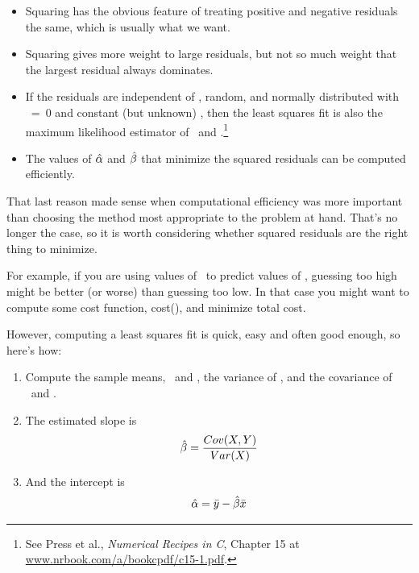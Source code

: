 \documentclass[12pt]{book}
\begin{document}
\begin{itemize}

\item Squaring has the obvious feature of treating positive and
negative residuals the same, which is usually what we want.

\item Squaring gives more weight to large residuals, but not
so much weight that the largest residual always dominates.

\item If the residuals are independent of \x, random, and normally
  distributed with \mymu~=~0 and constant (but unknown) \mysigma, then
  the least squares fit is also the maximum likelihood estimator of
  \myinter~and \myslope.\footnote{See Press et al., {\em Numerical Recipes in C},
    Chapter 15 at \url{www.nrbook.com/a/bookcpdf/c15-1.pdf}.}

\item The values of $\hat{\alpha}$ and $\hat{\beta}$ that minimize
  the squared residuals can be computed efficiently.

\end{itemize}

That last reason made sense when computational efficiency was more
important than choosing the method most appropriate to the problem
at hand.  That's no longer the case, so it is worth considering
whether squared residuals are the right thing to minimize.

For example, if you are using values of \X~to predict values of \Y,
guessing too high might be better (or worse) than guessing too low.
In that case you might want to compute some cost function,
cost(\myeps{}), and minimize total cost.

However, computing a least squares fit is quick, easy and often good
enough, so here's how:

\begin{enumerate}

\item Compute the sample means, \myxbar~and \myybar, the variance
of \X, and the covariance of \X~and \Y.

\item The estimated slope is
%
\[ \hat{\beta} = \frac{Cov(X,Y)}{Var(X)} \]
%
\item And the intercept is
%
\[ \hat{\alpha} = \bar{y} - \hat{\beta} \bar{x} \]
%
\end{enumerate}
\end{document}
